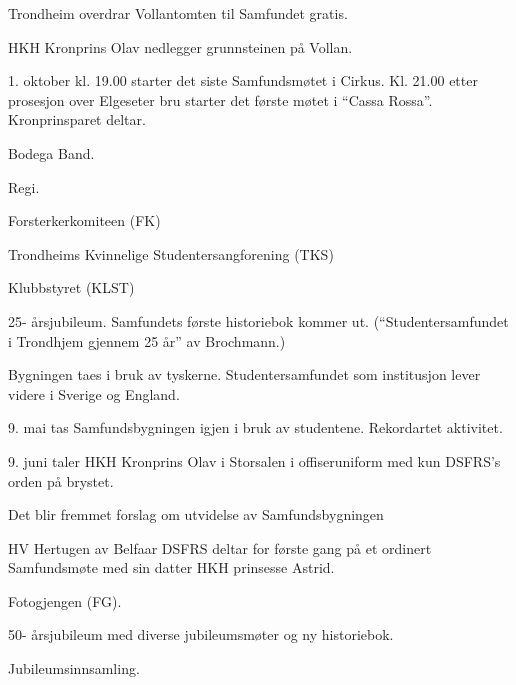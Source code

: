   \item Trondheim overdrar Vollantomten til Samfundet gratis.
\yearend 

  \item HKH Kronprins Olav nedlegger grunnsteinen på Vollan.
\yearend 

  \item 1. oktober kl. 19.00 starter det siste Samfundsmøtet i Cirkus. Kl. 21.00 etter prosesjon over Elgeseter bru starter
det første møtet i ``Cassa Rossa''. Kronprinsparet deltar.
  \item Bodega Band.
  \item Regi.
\yearend 

  \item Forsterkerkomiteen (FK)
  \item Trondheims Kvinnelige Studentersangforening (TKS)
\yearend 

  \item Klubbstyret (KLST)
\yearend 

  \item 25- årsjubileum. Samfundets første historiebok kommer ut. (``Studentersamfundet i Trondhjem gjennem 25 år'' av
Brochmann.)
\yearend 

  \item Bygningen taes i bruk av tyskerne. Studentersamfundet som institusjon lever videre i Sverige og England.
\yearend 

  \item 9. mai tas Samfundsbygningen igjen i bruk av studentene. Rekordartet aktivitet.
  \item 9. juni taler HKH Kronprins Olav i Storsalen i offiseruniform med kun DSFRS's orden på brystet.
\yearend 

  \item Det blir fremmet forslag om utvidelse av Samfundsbygningen
\yearend 

  \item HV Hertugen av Belfaar DSFRS deltar for første gang på et ordinert Samfundsmøte med sin datter HKH
prinsesse Astrid.
\yearend 

  \item Fotogjengen (FG).
\yearend 

  \item 50- årsjubileum med diverse jubileumsmøter og ny historiebok.
  \item Jubileumsinnsamling.
\yearend 

